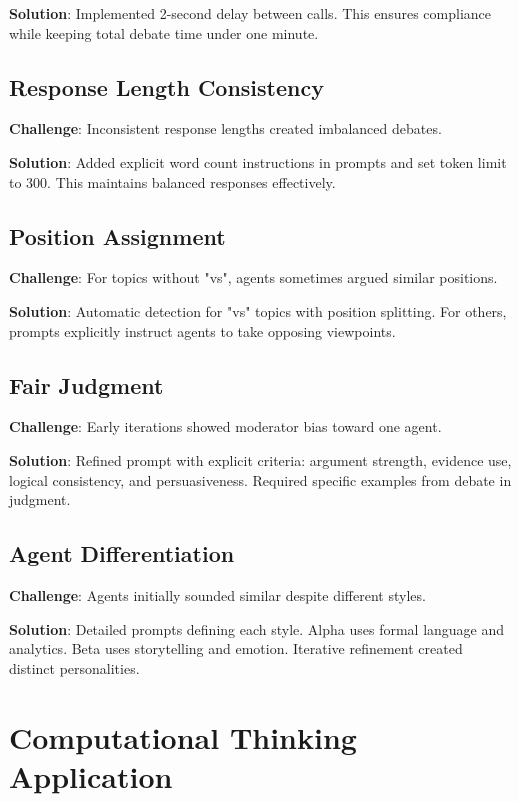 \documentclass[conference]{IEEEtran}
\begin{document}
\textbf{Solution}: Implemented 2-second delay between calls. This ensures compliance while keeping total debate time under one minute.

\subsection{Response Length Consistency}

\textbf{Challenge}: Inconsistent response lengths created imbalanced debates.

\textbf{Solution}: Added explicit word count instructions in prompts and set token limit to 300. This maintains balanced responses effectively.

\subsection{Position Assignment}

\textbf{Challenge}: For topics without "vs", agents sometimes argued similar positions.

\textbf{Solution}: Automatic detection for "vs" topics with position splitting. For others, prompts explicitly instruct agents to take opposing viewpoints.

\subsection{Fair Judgment}

\textbf{Challenge}: Early iterations showed moderator bias toward one agent.

\textbf{Solution}: Refined prompt with explicit criteria: argument strength, evidence use, logical consistency, and persuasiveness. Required specific examples from debate in judgment.

\subsection{Agent Differentiation}

\textbf{Challenge}: Agents initially sounded similar despite different styles.

\textbf{Solution}: Detailed prompts defining each style. Alpha uses formal language and analytics. Beta uses storytelling and emotion. Iterative refinement created distinct personalities.

\section{Computational Thinking Application}
\end{document}
